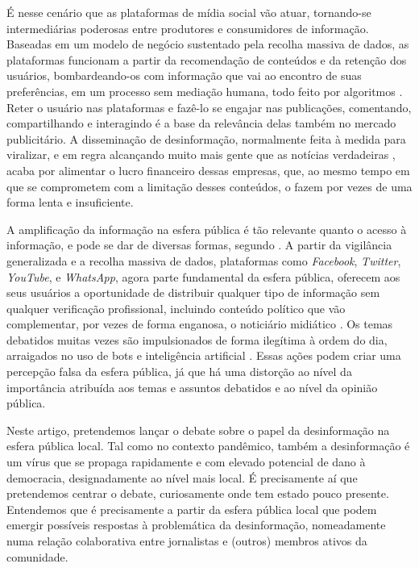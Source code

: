 \documentclass[portuguese]{textolivre}
\begin{document}
É nesse cenário que as plataformas de mídia social vão atuar, tornando-se intermediárias poderosas entre produtores e consumidores de informação. Baseadas em um modelo de negócio sustentado pela recolha massiva de dados, as plataformas funcionam a partir da recomendação de conteúdos e da retenção dos usuários, bombardeando-os com informação que vai ao encontro de suas preferências, em um processo sem mediação humana, todo feito por algoritmos \cite{rieder2018examinando}. Reter o usuário nas plataformas e fazê-lo se engajar nas publicações, comentando, compartilhando e interagindo é a base da relevância delas também no mercado publicitário. A disseminação de desinformação, normalmente feita à medida para viralizar, e em regra alcançando muito mais gente que as notícias verdadeiras \cite{baptista_understanding_2020, vosoughi_spread_2018}, acaba por alimentar o lucro financeiro dessas empresas, que, ao mesmo tempo em que se comprometem com a limitação desses conteúdos, o fazem por vezes de uma forma lenta e insuficiente.

A amplificação da informação na esfera pública é tão relevante quanto o acesso à informação, e pode se dar de diversas formas, segundo \textcite{jungherr_disinformation_2021}. A partir da vigilância generalizada e a recolha massiva de dados, plataformas como \emph{Facebook}, \emph{Twitter}, \emph{YouTube}, e \emph{WhatsApp}, agora parte fundamental da esfera pública, oferecem aos seus usuários a oportunidade de distribuir qualquer tipo de informação sem qualquer verificação profissional, incluindo conteúdo político que vão complementar, por vezes de forma enganosa, o noticiário midiático \cite{jungherr_disinformation_2021}. Os temas debatidos muitas vezes são impulsionados de forma ilegítima à ordem do dia, arraigados no uso de bots e inteligência artificial \cite{jeronimoespartaza022}. Essas ações podem criar uma percepção falsa da esfera pública, já que há uma distorção ao nível da importância atribuída aos temas e assuntos debatidos e ao nível da opinião pública.

Neste artigo, pretendemos lançar o debate sobre o papel da desinformação na esfera pública local. Tal como no contexto pandêmico, também a desinformação é um vírus que se propaga rapidamente e com elevado potencial de dano à democracia, designadamente ao nível mais local. É precisamente aí que pretendemos centrar o debate, curiosamente onde tem estado pouco presente. Entendemos que é precisamente a partir da esfera pública local que podem emergir possíveis respostas à problemática da desinformação, nomeadamente numa relação colaborativa entre jornalistas e (outros) membros ativos da comunidade.
\end{document}
